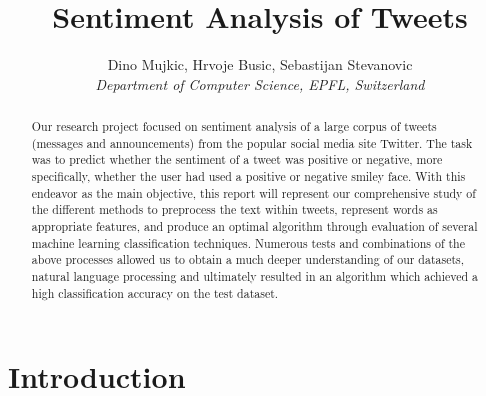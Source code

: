 \documentclass[10pt,conference]{IEEEtran}
\begin{document}
\title{Sentiment Analysis of Tweets}

\author{
  Dino Mujkic, Hrvoje Busic, Sebastijan Stevanovic\\
  \textit{Department of Computer Science, EPFL, Switzerland}
}

\maketitle

\begin{abstract}
Our research project focused on sentiment analysis of a large corpus of tweets (messages and announcements) from the popular social media site Twitter. The task was to predict whether the sentiment of a tweet was positive or negative, more specifically, whether the user had used a positive or negative smiley face. With this endeavor as the main objective, this report will represent our comprehensive study of the different methods to preprocess the text within tweets, represent words as appropriate features, and produce an optimal algorithm through evaluation of several machine learning classification techniques. Numerous tests and combinations of the above processes allowed us to obtain a much deeper understanding of our datasets, natural language processing and ultimately resulted in an algorithm which achieved a high classification accuracy on the test dataset.
\end{abstract}

\section{Introduction}
\end{document}
